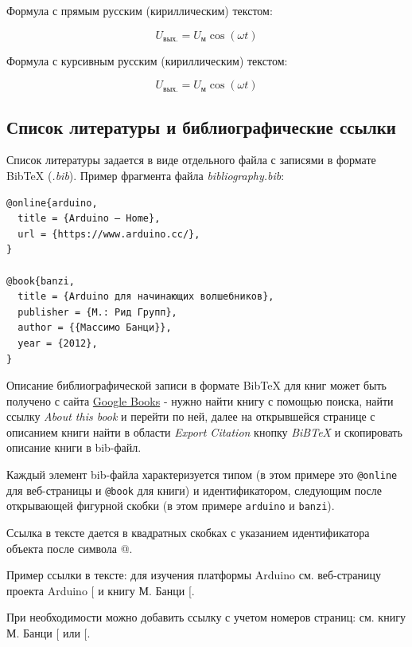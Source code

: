 \documentclass[
  a4paper,
]{book}
\theoremstyle{definition}
\theoremstyle{definition}
\theoremstyle{definition}
\theoremstyle{definition}
\theoremstyle{remark}
\begin{document}
Формула с прямым русским (кириллическим) текстом:

\begin{equation}
U_\text{вых.} = U_\text{м} \cos(\omega t)
\end{equation}

Формула с курсивным русским (кириллическим) текстом:

\begin{equation}
U_\textit{вых.} = U_\textit{м} \cos(\omega t)
\end{equation}

\subsection{Список литературы и библиографические ссылки}\label{markdown-syntax-bib}

Список литературы задается в виде отдельного файла с записями в формате BibTeX (\emph{.bib}). Пример фрагмента файла \emph{bibliography.bib}:

\begin{verbatim}
@online{arduino,
  title = {Arduino – Home},
  url = {https://www.arduino.cc/},
}

@book{banzi,
  title = {Arduino для начинающих волшебников},
  publisher = {М.: Рид Групп},
  author = {{Массимо Банци}},
  year = {2012},
}
\end{verbatim}

Описание библиографической записи в формате BibTeX для книг может быть получено с сайта \href{https://books.google.ru/}{Google Books} - нужно найти книгу с помощью поиска, найти ссылку \emph{About this book} и перейти по ней, далее на открывшейся странице с описанием книги найти в области \emph{Export Citation} кнопку \emph{BiBTeX} и скопировать описание книги в bib-файл.

Каждый элемент bib-файла характеризуется типом (в этом примере это \texttt{@online} для веб-страницы и \texttt{@book} для книги) и идентификатором, следующим после открывающей фигурной скобки (в этом примере \texttt{arduino} и \texttt{banzi}).

Ссылка в тексте дается в квадратных скобках с указанием идентификатора объекта после символа @.

Пример ссылки в тексте: для изучения платформы Arduino см. веб-страницу проекта Arduino {[}\citeproc{ref-arduino}{1}{]} и книгу М. Банци {[}\citeproc{ref-banzi}{2}{]}.

При необходимости можно добавить ссылку с учетом номеров страниц: см. книгу М. Банци {[}\citeproc{ref-banzi}{2, с. 11}{]} или {[}\citeproc{ref-banzi}{2, с. 15--20}{]}.
\end{document}
